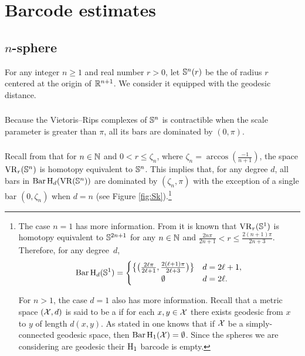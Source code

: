
\section{Barcode estimates}\label{s:computations}

\subsection{$n$-sphere}\label{ss:Sn}

For any integer $n \geq 1$ and real number $r > 0$, let $\mathbb{S}^n(r)$ be the  of radius $r$ centered at the origin of $\mathbb{R}^{n+1}$.
We consider it equipped with the geodesic distance.

\subsubsection{}

Because the Vietoris--Rips complexes of $\mathbb{S}^n$ is contractible when the scale parameter is greater than $\pi$, all its bars are dominated by $(0, \pi)$.

\subsubsection{} 

Recall from \cite[Thm.~10]{lim2020vietoris} that for $n \in \mathbb{N}$ and  $0 < r \leq \zeta_n$, where $\zeta_n = \arccos(\tfrac{-1}{n+1})$, the space $\operatorname{VR}_r(\mathbb{S}^n)$ is homotopy equivalent to $\mathbb{S}^n$.
This implies that, for any degree $d$, all bars in $\operatorname{Bar}\mathrm{H}_d(\operatorname{VR}(\mathbb{S}^n))$ are dominated by $(\zeta_n,\pi)$ with the exception of a single bar $(0,\zeta_n)$ when $d = n$ (see Figure \ref{fig:Sk}).\footnote{The case $n = 1$ has more information.
	From \cite[Thm.~7.4]{adamaszek2017vietoris} it is known that $\operatorname{VR}_r(\mathbb{S}^1)$ is homotopy equivalent to $\mathbb{S}^{2n+1}$ for any $n \in \mathbb{N}$ and $\frac{2n\pi}{2n+1} < r \leq \frac{2(n+1)\pi}{2n+3}$.
	Therefore, for any degree~$d$,
	\[
	\barc \rH_{d}(\bS^1) =
	\begin{cases}
		\set[\big]{\big(\tfrac{2\ell\pi}{2\ell+1}, \tfrac{2(\ell+1)\pi}{2\ell+3}\big)} & d = 2\ell+1, \\
		\hfil\emptyset & d = 2\ell.
	\end{cases}
	\]
	
	For $n > 1$, the case $d=1$ also has more information.
	Recall that a metric space $(\mathcal{X}, d)$ is said to be a  if for each $x, y \in \mathcal{X}$ there exists geodesic from $x$ to $y$ of length $d(x, y)$.
	As stated in \cite[Prop.~7.10]{virk20201} one knows that if $\mathcal{X}$ be a simply-connected geodesic space, then $\operatorname{Bar}\mathrm{H}_1(\mathcal{X}) = \emptyset$.
	Since the spheres we are considering are geodesic their $\mathrm{H}_1$ barcode is empty.}

